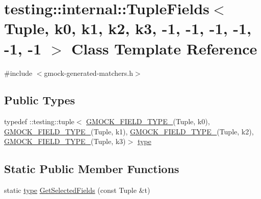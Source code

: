 \hypertarget{classtesting_1_1internal_1_1TupleFields_3_01Tuple_00_01k0_00_01k1_00_01k2_00_01k3_00_01-1_00_01-5ce285d726b58f03354f318c4712939e}{}\section{testing\+::internal\+::Tuple\+Fields$<$ Tuple, k0, k1, k2, k3, -\/1, -\/1, -\/1, -\/1, -\/1, -\/1 $>$ Class Template Reference}
\label{classtesting_1_1internal_1_1TupleFields_3_01Tuple_00_01k0_00_01k1_00_01k2_00_01k3_00_01-1_00_01-5ce285d726b58f03354f318c4712939e}


{\ttfamily \#include $<$gmock-\/generated-\/matchers.\+h$>$}

\subsection*{Public Types}
\begin{DoxyCompactItemize}
\item 
typedef \+::testing\+::tuple$<$ \mbox{\hyperlink{gmock-generated-matchers_8h_acf3e27de83a73f0d873da1cd471e505b}{G\+M\+O\+C\+K\+\_\+\+F\+I\+E\+L\+D\+\_\+\+T\+Y\+P\+E\+\_\+}}(Tuple, k0), \mbox{\hyperlink{gmock-generated-matchers_8h_acf3e27de83a73f0d873da1cd471e505b}{G\+M\+O\+C\+K\+\_\+\+F\+I\+E\+L\+D\+\_\+\+T\+Y\+P\+E\+\_\+}}(Tuple, k1), \mbox{\hyperlink{gmock-generated-matchers_8h_acf3e27de83a73f0d873da1cd471e505b}{G\+M\+O\+C\+K\+\_\+\+F\+I\+E\+L\+D\+\_\+\+T\+Y\+P\+E\+\_\+}}(Tuple, k2), \mbox{\hyperlink{gmock-generated-matchers_8h_acf3e27de83a73f0d873da1cd471e505b}{G\+M\+O\+C\+K\+\_\+\+F\+I\+E\+L\+D\+\_\+\+T\+Y\+P\+E\+\_\+}}(Tuple, k3)$>$ \mbox{\hyperlink{classtesting_1_1internal_1_1TupleFields_3_01Tuple_00_01k0_00_01k1_00_01k2_00_01k3_00_01-1_00_01-5ce285d726b58f03354f318c4712939e_a543de8075300fc9ee1b9f3494d492fb5}{type}}
\end{DoxyCompactItemize}
\subsection*{Static Public Member Functions}
\begin{DoxyCompactItemize}
\item 
static \mbox{\hyperlink{classtesting_1_1internal_1_1TupleFields_3_01Tuple_00_01k0_00_01k1_00_01k2_00_01k3_00_01-1_00_01-5ce285d726b58f03354f318c4712939e_a543de8075300fc9ee1b9f3494d492fb5}{type}} \mbox{\hyperlink{classtesting_1_1internal_1_1TupleFields_3_01Tuple_00_01k0_00_01k1_00_01k2_00_01k3_00_01-1_00_01-5ce285d726b58f03354f318c4712939e_ab425de0d7d5a7f13894b5e52ad8b553a}{Get\+Selected\+Fields}} (const Tuple \&t)
\end{DoxyCompactItemize}


